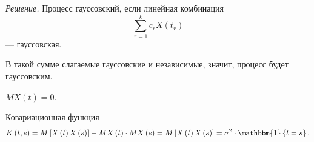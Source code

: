 \textit{Решение.}
Процесс гауссовский, если линейная комбинация
$$ \sum \limits_{r = 1}^k c_r X \left( t_r \right) $$
--- гауссовская.

В такой сумме слагаемые гауссовские и независимые, значит, процесс будет гауссовским.

$MX \left( t \right) = 0$.

Ковариационная функция
$$K \left( t, s \right) =
  M \left[ X \left( t \right) X \left( s \right) \right] -
  MX \left( t \right) \cdot MX \left( s \right) =
  M \left[ X \left( t \right) X \left( s \right) \right] =
  \sigma^2 \cdot \mathbbm{1} \left\{ t = s \right\}.$$
